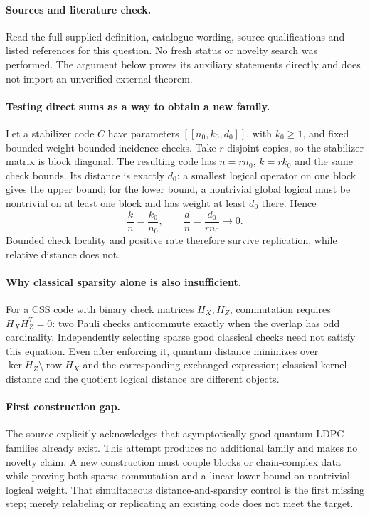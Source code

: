 \documentclass[11pt]{article}
\begin{document}
\paragraph{Sources and literature check.}
Read the full supplied definition, catalogue wording, source qualifications and listed references for this question. No fresh status or novelty search was performed. The argument below proves its auxiliary statements directly and does not import an unverified external theorem.

\paragraph{Testing direct sums as a way to obtain a new family.} Let a stabilizer code \(C\) have parameters \([[n_0,k_0,d_0]]\), with \(k_0\geq1\), and fixed bounded-weight bounded-incidence checks. Take \(r\) disjoint copies, so the stabilizer matrix is block diagonal. The resulting code has \(n=rn_0\), \(k=rk_0\) and the same check bounds. Its distance is exactly \(d_0\): a smallest logical operator on one block gives the upper bound; for the lower bound, a nontrivial global logical must be nontrivial on at least one block and has weight at least \(d_0\) there. Hence
\[
 \frac{k}{n}=\frac{k_0}{n_0},\qquad
 \frac{d}{n}=\frac{d_0}{rn_0}\longrightarrow0.
\]
Bounded check locality and positive rate therefore survive replication, while relative distance does not.
\paragraph{Why classical sparsity alone is also insufficient.} For a CSS code with binary check matrices \(H_X,H_Z\), commutation requires \(H_XH_Z^T=0\): two Pauli checks anticommute exactly when the overlap has odd cardinality. Independently selecting sparse good classical checks need not satisfy this equation. Even after enforcing it, quantum distance minimizes over \(\ker H_Z\setminus\operatorname{row}H_X\) and the corresponding exchanged expression; classical kernel distance and the quotient logical distance are different objects.
\paragraph{First construction gap.} The source explicitly acknowledges that asymptotically good quantum LDPC families already exist. This attempt produces no additional family and makes no novelty claim. A new construction must couple blocks or chain-complex data while proving both sparse commutation and a linear lower bound on nontrivial logical weight. That simultaneous distance-and-sparsity control is the first missing step; merely relabeling or replicating an existing code does not meet the target.
\end{document}

